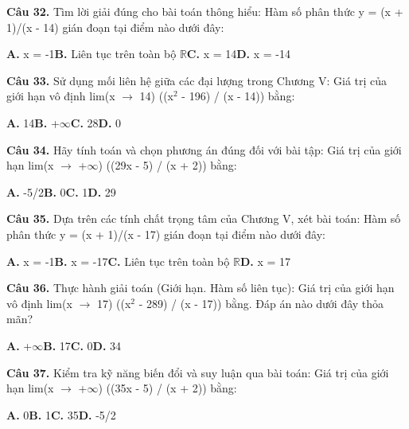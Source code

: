 \documentclass[11pt,a4paper]{article}
\begin{document}
\textbf{\color{primary} Câu 32.} Tìm lời giải đúng cho bài toán thông hiểu: Hàm số phân thức y = (x + 1)/(x - 14) gián đoạn tại điểm nào dưới đây:\par
\hspace*{1.5em}\textbf{A.} x = -1\quad\quad \textbf{B.} Liên tục trên toàn bộ $\mathbb{R}$\quad\quad \textbf{C.} x = 14\quad\quad \textbf{D.} x = -14\par\vspace{2pt}
\textbf{\color{primary} Câu 33.} Sử dụng mối liên hệ giữa các đại lượng trong Chương V: Giá trị của giới hạn vô định lim(x $\to$ 14) ((x$^2$ - 196) / (x - 14)) bằng:\par
\hspace*{1.5em}\textbf{A.} 14\quad\quad \textbf{B.} +$\infty$\quad\quad \textbf{C.} 28\quad\quad \textbf{D.} 0\par\vspace{2pt}
\textbf{\color{primary} Câu 34.} Hãy tính toán và chọn phương án đúng đối với bài tập: Giá trị của giới hạn lim(x $\to$ +$\infty$) ((29x - 5) / (x + 2)) bằng:\par
\hspace*{1.5em}\textbf{A.} -5/2\quad\quad \textbf{B.} 0\quad\quad \textbf{C.} 1\quad\quad \textbf{D.} 29\par\vspace{2pt}
\textbf{\color{primary} Câu 35.} Dựa trên các tính chất trọng tâm của Chương V, xét bài toán: Hàm số phân thức y = (x + 1)/(x - 17) gián đoạn tại điểm nào dưới đây:\par
\hspace*{1.5em}\textbf{A.} x = -1\quad\quad \textbf{B.} x = -17\quad\quad \textbf{C.} Liên tục trên toàn bộ $\mathbb{R}$\quad\quad \textbf{D.} x = 17\par\vspace{2pt}
\textbf{\color{primary} Câu 36.} Thực hành giải toán (Giới hạn. Hàm số liên tục): Giá trị của giới hạn vô định lim(x $\to$ 17) ((x$^2$ - 289) / (x - 17)) bằng. Đáp án nào dưới đây thỏa mãn?\par
\hspace*{1.5em}\textbf{A.} +$\infty$\quad\quad \textbf{B.} 17\quad\quad \textbf{C.} 0\quad\quad \textbf{D.} 34\par\vspace{2pt}
\textbf{\color{primary} Câu 37.} Kiểm tra kỹ năng biến đổi và suy luận qua bài toán: Giá trị của giới hạn lim(x $\to$ +$\infty$) ((35x - 5) / (x + 2)) bằng:\par
\hspace*{1.5em}\textbf{A.} 0\quad\quad \textbf{B.} 1\quad\quad \textbf{C.} 35\quad\quad \textbf{D.} -5/2\par\vspace{2pt}
\end{document}
